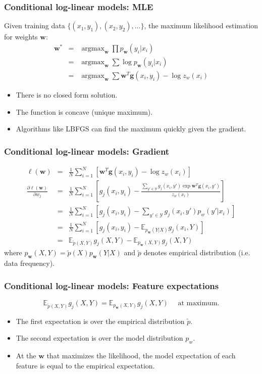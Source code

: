 \documentclass[ignorenonframetext,plain]{beamer}
\DeclareMathOperator*{\argmax}{argmax}
\renewcommand{\vec}{\mathbf}
\begin{document}
\begin{frame}\frametitle{Conditional log-linear models: MLE}
Given training data $\{(x_1, y_1), (x_2, y_2), \dots \}$, the
maximum likelihood estimation for weights $\vec{w}$: \begin{eqnarray*}
\vec{w^*} &=& \argmax_\vec{w} \prod p_\vec{w}(y_i | x_i) \\
&=& \argmax_\vec{w} \sum \log p_\vec{w}(y_i | x_i) \\
&=& \argmax_\vec{w} \sum \vec{w}^T \vec{g}(x_i, y_i) - \log z_w(x_i)
\end{eqnarray*}
\begin{itemize}
\item There is no closed form solution.
\item The function is concave (unique maximum).
\item Algorithms like LBFGS can find the maximum quickly given the
  gradient.
\end{itemize}
\end{frame}

\begin{frame}\frametitle{Conditional log-linear models: Gradient}
\begin{eqnarray*}
\ell(\vec{w}) &=& \frac{1}{N} \sum_{i=1}^N \left[ \vec{w}^T
    \vec{g}(x_i, y_i) - \log z_w(x_i) \right] \\
\frac{\partial \ell(\vec{w})}{\partial w_j} &=& \frac{1}{N}
  \sum_{i=1}^N \left[ g_j(x_i, y_i) - \frac{\sum_{y'\in\mathcal{Y}}
      g_j(x_i, y') \exp \vec{w}^T \vec{g}(x_i, y')}{z_w(x_i)}
    \right] \\
&=& \frac{1}{N} \sum_{i=1}^N \left[ g_j(x_i, y_i) -
    \sum_{y'\in\mathcal{Y}} g_j(x_i, y') p_w(y'|x_i) \right] \\
&=& \frac{1}{N} \sum_{i=1}^N \left[ g_j(x_i, y_i) -
    \mathbb{E}_{p_\vec{w}(Y|X)} g_j(x_i ,Y) \right] \\
&=& \mathbb{E}_{\tilde{p}(X,Y)} g_j(X,Y) -
  \mathbb{E}_{p_\vec{w}(X,Y)} g_j(X,Y)
\end{eqnarray*}
where $p_\vec{w}(X,Y) = \tilde{p}(X)p_\vec{w}(Y|X)$ and
$\tilde{p}$ denotes empirical distribution (i.e. data frequency).
\end{frame}

\begin{frame}\frametitle{Conditional log-linear models: Feature expectations}
\[
\mathbb{E}_{\tilde{p}(X,Y)} g_j(X,Y) =
  \mathbb{E}_{p_\vec{w}(X,Y)} g_j(X,Y)\quad \mbox{ at maximum.}
\]
\begin{itemize}
\item The first expectation is over the empirical distribution
  $\tilde{p}$.
\item The second expectation is over the model distribution $p_w$.
\item At the $\vec{w}$ that maximizes the likelihood, the model
  expectation of each feature is equal to the empirical expectation.
\end{itemize}
\end{frame}
\end{document}
